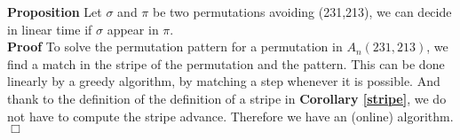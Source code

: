 \documentclass[12pt, a4paper]{article}
\newcommand{\C}[1]{A_{#1}(231,213)}
\newcommand{\ptext}{\pi}
\newcommand{\pmotif}{\sigma}
\newcounter{num}
\newcommand{\num}{\stepcounter{num} }
\begin{document}
		\textbf{Proposition  \num \thenum} Let $\pmotif$ and $\ptext$
		be two permutations avoiding (231,213), 
		we can decide in linear time if $\pmotif$ 
		appear in $\ptext$.\\	
		
		\textbf{Proof}	
		To solve the permutation pattern for a permutation in $\C{n}$, 
		we find a match in the stripe of the permutation and the pattern.
		This can be done linearly by a greedy algorithm, 
		by matching a step whenever it is possible.
		And thank to the definition of the definition of a stripe in \textbf{Corollary \ref{stripe}},
		we do not have to compute the stripe advance.
		Therefore we have an (online) algorithm.$\Box$\\
				

		
\end{document}
